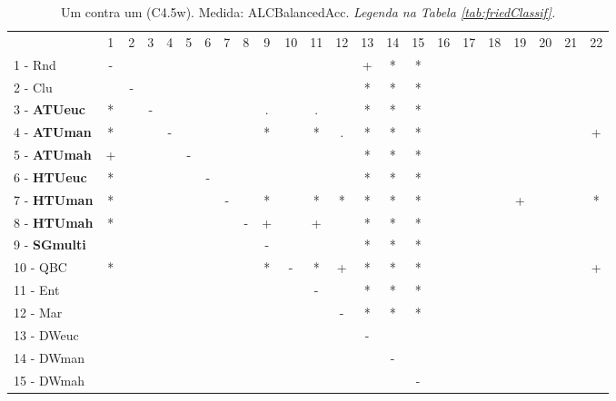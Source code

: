 \begin{table}[h]
\caption{Um contra um (C4.5w). Medida: ALCBalancedAcc. \textit{Legenda na Tabela \ref{tab:friedClassif}.}}
\begin{center}\begin{tabular}{lcc|cc|cc|cc|cc|cc|cc|cc|cc|cc|cc}
 			& 1 & 2 & 3 & 4 & 5 & 6 & 7 & 8 & 9 & 10 & 11 & 12 & 13 & 14 & 15 & 16 & 17 & 18 & 19 & 20 & 21 & 22\\
1 - Rnd  	& - &   &   &   &   &   &   &   &   &   &   &   & + & * & * &   &   &   &   &   &   &   \\
2 - Clu  	&   & - &   &   &   &   &   &   &   &   &   &   & * & * & * &   &   &   &   &   &   &   \\ \hline
3 - \textbf{ATUeuc}	& * &   & - &   &   &   &   &   & . &   & . &   & * & * & * &   &   &   &   &   &   &   \\
4 - \textbf{ATUman}	& * &   &   & - &   &   &   &   & * &   & * & . & * & * & * &   &   &   &   &   &   & + \\ \hline
5 - \textbf{ATUmah}	& + &   &   &   & - &   &   &   &   &   &   &   & * & * & * &   &   &   &   &   &   &   \\
6 - \textbf{HTUeuc}	& * &   &   &   &   & - &   &   &   &   &   &   & * & * & * &   &   &   &   &   &   &   \\ \hline
7 - \textbf{HTUman}	& * &   &   &   &   &   & - &   & * &   & * & * & * & * & * &   &   &   & + &   &   & * \\
8 - \textbf{HTUmah}	& * &   &   &   &   &   &   & - & + &   & + &   & * & * & * &   &   &   &   &   &   &   \\ \hline
9 - \textbf{SGmulti}	&   &   &   &   &   &   &   &   & - &   &   &   & * & * & * &   &   &   &   &   &   &   \\
10 - QBC  	& * &   &   &   &   &   &   &   & * & - & * & + & * & * & * &   &   &   &   &   &   & + \\ \hline
11 - Ent  	&   &   &   &   &   &   &   &   &   &   & - &   & * & * & * &   &   &   &   &   &   &   \\
12 - Mar  	&   &   &   &   &   &   &   &   &   &   &   & - & * & * & * &   &   &   &   &   &   &   \\ \hline
13 - DWeuc	&   &   &   &   &   &   &   &   &   &   &   &   & - &   &   &   &   &   &   &   &   &   \\
14 - DWman	&   &   &   &   &   &   &   &   &   &   &   &   &   & - &   &   &   &   &   &   &   &   \\ \hline
15 - DWmah	&   &   &   &   &   &   &   &   &   &   &   &   &   &   & - &   &   &   &   &   &   &   \\

\end{tabular}
\end{center}
\end{table}
